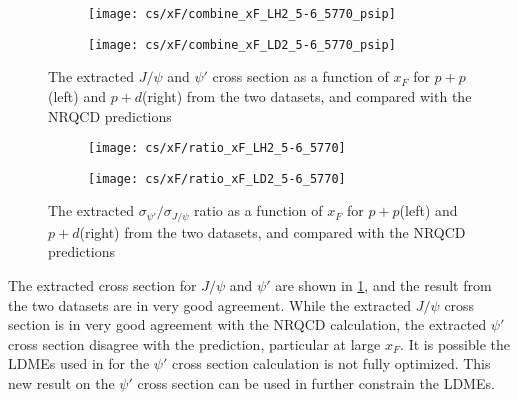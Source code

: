 \documentclass[../main.tex]{subfiles}
\begin{document}
\begin{figure}[h!]
	\centering
	\begin{subfigure}{0.45\linewidth}
		\texttt{[image: cs/xF/combine\_xF\_LH2\_5-6\_5770\_psip]}
	\end{subfigure}
	\centering
	\begin{subfigure}{0.45\linewidth}
		\texttt{[image: cs/xF/combine\_xF\_LD2\_5-6\_5770\_psip]}
	\end{subfigure}
	\caption{The extracted $J/\psi$ and $\psi'$ cross section as a function of $x_F$ for $p+p$(left)
	and $p+d$(right) from the two datasets,	and compared with the NRQCD predictions}
	\label{fig:cs_xF_combined}
\end{figure}
\begin{figure}[h!]
	\centering
	\begin{subfigure}{0.45\linewidth}
		\texttt{[image: cs/xF/ratio\_xF\_LH2\_5-6\_5770]}
	\end{subfigure}
	\begin{subfigure}{0.45\linewidth}
		\texttt{[image: cs/xF/ratio\_xF\_LD2\_5-6\_5770]}
	\end{subfigure}
	\caption{The extracted  $\sigma_{\psi'}/\sigma_{J/\psi}$ ratio as a function of $x_F$ for $p+p$(left)
	and $p+d$(right) from the two datasets,	and compared with the NRQCD predictions}
\end{figure}

The extracted cross section for $J/\psi$ and $\psi'$ are shown in \cref{fig:cs_xF_combined}, and
the result from the two datasets are in very good agreement. While the extracted 
$J/\psi$ cross section is in very good agreement with the NRQCD calculation, the extracted $\psi'$ 
cross section disagree with the prediction, particular at large $x_F$. It is possible the LDMEs used 
in for the $\psi'$ cross section calculation is not fully optimized. This new result on the $\psi'$ 
cross section can be used in further constrain the LDMEs.
\end{document}
